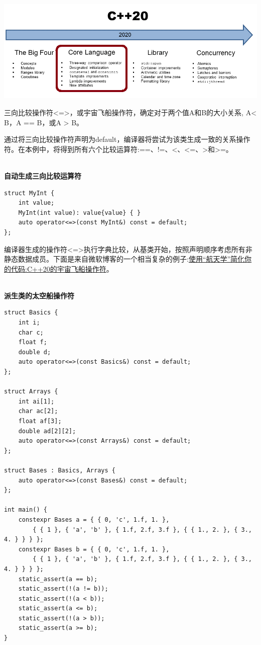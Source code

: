 

\begin{center}
\includegraphics[width=1.0\textwidth]{content/2/chapter3/images/4.png}\\
\end{center}


三向比较操作符<=>，或宇宙飞船操作符，确定对于两个值A和B的大小关系, A< B，A == B，或A > B。

通过将三向比较操作符声明为default，编译器将尝试为该类生成一致的关系操作符。在本例中，将得到所有六个比较运算符:==、!=、<、<=、>和>=。

\hspace*{\fill} \\ %
\noindent
\textbf{自动生成三向比较运算符}
\begin{lstlisting}[style=styleCXX]
struct MyInt {
	int value;
	MyInt(int value): value{value} { }
	auto operator<=>(const MyInt&) const = default;
};
\end{lstlisting}

编译器生成的操作符<=>执行字典比较，从基类开始，按照声明顺序考虑所有非静态数据成员。下面是来自微软博客的一个相当复杂的例子:\href{https://devblogs.microsoft.com/cppblog/simplify-your-code-with-rocket-science-c20s-spaceship-operator/}{使用“航天学”简化你的代码:C++20的宇宙飞船操作符}。


\hspace*{\fill} \\ %
\noindent
\textbf{派生类的太空船操作符}
\begin{lstlisting}[style=styleCXX]
struct Basics {
	int i;
	char c;
	float f;
	double d;
	auto operator<=>(const Basics&) const = default;
};

struct Arrays {
	int ai[1];
	char ac[2];
	float af[3];
	double ad[2][2];
	auto operator<=>(const Arrays&) const = default;
};

struct Bases : Basics, Arrays {
	auto operator<=>(const Bases&) const = default;
};

int main() {
	constexpr Bases a = { { 0, 'c', 1.f, 1. },
		{ { 1 }, { 'a', 'b' }, { 1.f, 2.f, 3.f }, { { 1., 2. }, { 3., 4. } } } };
	constexpr Bases b = { { 0, 'c', 1.f, 1. },
		{ { 1 }, { 'a', 'b' }, { 1.f, 2.f, 3.f }, { { 1., 2. }, { 3., 4. } } } };
	static_assert(a == b);
	static_assert(!(a != b));
	static_assert(!(a < b));
	static_assert(a <= b);
	static_assert(!(a > b));
	static_assert(a >= b);
}
\end{lstlisting}

